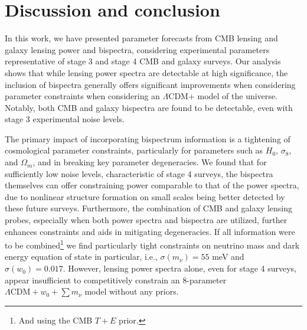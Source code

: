 \documentclass[11pt]{article} %
\begin{document}
\section{Discussion and conclusion}\label{sec:discussion}
In this work, we have presented parameter forecasts from CMB lensing and galaxy lensing power and bispectra, considering experimental parameters representative of stage 3 and stage 4 CMB and galaxy surveys. Our analysis shows that while lensing power spectra are detectable at high significance, the inclusion of bispectra generally offers significant improvements when considering parameter constraints when considering an $\Lambda$CDM+ model of the universe. Notably, both CMB and galaxy bispectra are found to be detectable, even with stage 3 experimental noise levels.

The primary impact of incorporating bispectrum information is a tightening of cosmological parameter constraints, particularly for parameters such as $H_0$, $\sigma_8$, and $\Omega_m$, and in breaking key parameter degeneracies. We found that for sufficiently low noise levels, characteristic of stage 4 surveys, the bispectra themselves can offer constraining power comparable to that of the power spectra, due to nonlinear structure formation on small scales being better detected by these future surveys. Furthermore, the combination of CMB and galaxy lensing probes, especially when both power spectra and bispectra are utilized, further enhances constraints and aids in mitigating degeneracies. If all information were to be combined\footnote{And using the CMB $T+E$ prior.} we find particularly tight constraints on neutrino mass and dark energy equation of state in particular, i.e., $\sigma(m_\nu) = 55$ meV and $\sigma(w_0) = 0.017$. However, lensing power spectra alone, even for stage 4 surveys, appear insufficient to competitively constrain an 8-parameter $\Lambda\text{CDM} + w_0 + \sum m_\nu$ model without any priors.
\end{document}
